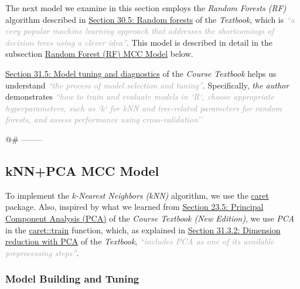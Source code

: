 \documentclass[
]{report}
\begin{document}
The next model we examine in this section employs the \emph{Random Forests (RF)} algorithm described in \href{https://rafalab.dfci.harvard.edu/dsbook-part-2/ml/algorithms.html\#sec-random-forests}{Section 30.5: Random forests} of the \emph{Textbook}, which is \textcolor{darkgray}{\textit{``a very popular machine learning approach that addresses the shortcomings of decision trees using a clever idea''}}\autocite{IDS2_30.5}.
This model is described in detail in the subsection \hyperref[rf_model]{Random Forest (RF) MCC Model} below.

\href{https://rafalab.dfci.harvard.edu/dsbook-part-2/ml/ml-in-practice.html\#sec-knn-in-practice}{Section 31.5: Model tuning and diagnostics} of the \emph{Course Textbook} helps us understand \textcolor{darkgray}{\textit{``the process of model selection and tuning''}}. Specifically, \emph{the author} demonstrates \textcolor{darkgray}{\textit{``how to train and evaluate models in `R`, choose appropriate hyperparameters, such as `k` for kNN and tree-related parameters for random forests, and assess performance using cross-validation''}}\autocite{IDS2_31.5}

\newpage

@\# --------

\subsection{kNN+PCA MCC Model}\label{knn_pca_model}

To implement the \emph{k-Nearest Neighbors (kNN)} algorithm, we use the \href{https://topepo.github.io/caret/index.html}{caret} package. Also, inspired by what we learned from \href{https://rafalab.dfci.harvard.edu/dsbook-part-2/highdim/dimension-reduction.html\#sec-pca}{Section 23.5: Principal Component Analysis (PCA)} of the \emph{Course Textbook (New Edition)}\autocite{IDS2_23.5}, we use \emph{PCA} in the \href{https://topepo.github.io/caret/model-training-and-tuning.html}{caret::train} function, which, as explained in \href{https://rafalab.dfci.harvard.edu/dsbook-part-2/ml/ml-in-practice.html\#dimension-reduction-with-pca}{Section 31.3.2: Dimension reduction with PCA} of the \emph{Textbook}, \textcolor{darkgray}{\textit{``includes PCA as one of its available preprocessing steps''}}\autocite{IDS2_31.3.2}.

\subsubsection{Model Building and Tuning}\label{knn_pca_mcc.build}
\end{document}
